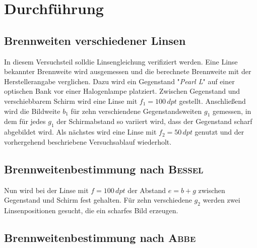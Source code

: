 \section{Durchführung}
\label{sec:Durchfuehrung}
\subsection{Brennweiten verschiedener Linsen}

In diesem Versuchsteil solldie Linsengleichung verifiziert werden. Eine Linse bekannter Brennweite wird ausgemessen und die berechnete Brennweite mit der Herstellerangabe verglichen.
Dazu wird ein Gegenstand "\emph{Pearl L}" auf einer optischen Bank vor einer Halogenlampe platziert.
 Zwischen Gegenstand und verschiebbarem Schirm wird eine Linse mit $f_1=100\,dpt$ gestellt.
 Anschließend wird die Bildweite $b_1$ für zehn verschiendene Gegenstandsweiten $g_1$ gemessen, in dem für jedes $g_1$ der Schirmabstand so variiert wird, dass der Gegenstand scharf abgebildet wird.
Als nächstes wird eine Linse mit $f_2=50\,dpt$ genutzt und der vorhergehend beschriebene Versuchsablauf wiederholt.

\subsection{Brennweitenbestimmung nach \textsc{Bessel}}

Nun wird bei der Linse mit $f=100\,dpt$ der Abstand $e=b+g$ zwischen Gegenstand und Schirm fest gehalten. 
Für zehn verschiedene $g_2$ werden zwei Linsenpositionen gesucht, die ein scharfes Bild erzeugen. 

\subsection{Brennweitenbestimmung nach \textsc{Abbe}}
